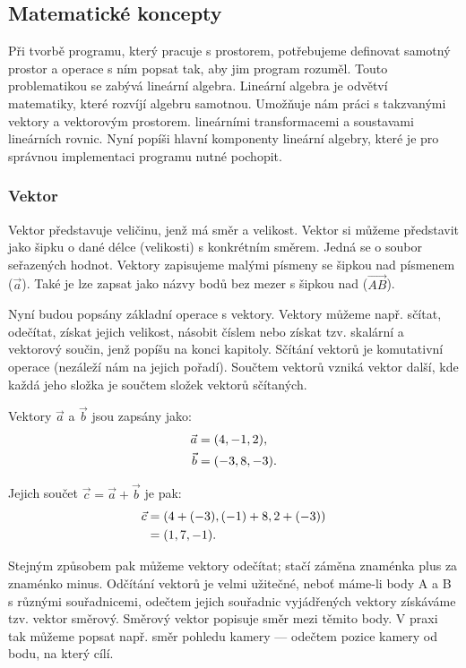 \documentclass[12pt]{article}
\begin{document}
\subsection{Matematické koncepty}

Při tvorbě programu, který pracuje s prostorem, potřebujeme definovat samotný prostor a operace s ním popsat tak, aby jim program rozuměl. Touto problematikou se zabývá lineární algebra. Lineární algebra je odvětví matematiky, které rozvíjí algebru samotnou. Umožňuje nám práci s takzvanými vektory a vektorovým prostorem. lineárními transformacemi a soustavami lineárních rovnic. \cite{linear_algebra} Nyní popíši hlavní komponenty lineární algebry, které je pro správnou implementaci programu nutné pochopit.

\subsubsection{Vektor} \label{vector}

Vektor představuje veličinu, jenž má směr a velikost. Vektor si můžeme představit jako šipku o dané délce (velikosti) s konkrétním směrem. Jedná se o soubor seřazených hodnot. Vektory zapisujeme malými písmeny se šipkou nad písmenem ($\vec{a}$). Také je lze zapsat jako názvy bodů bez mezer s šipkou nad ($\vec{AB}$). \cite{vector}

Nyní budou popsány základní operace s vektory. Vektory můžeme např. sčítat, odečítat, získat jejich velikost, násobit číslem nebo získat tzv. skalární a vektorový součin, jenž popíšu na konci kapitoly. Sčítání vektorů je komutativní operace (nezáleží nám na jejich pořadí). Součtem vektorů vzniká vektor další, kde každá jeho složka je součtem složek vektorů sčítaných.

Vektory $\vec{a}$ a $\vec{b}$ jsou zapsány jako:
\begin{align}
    \vec{a} &= (4, -1, 2), \notag \\
    \vec{b} &= (-3, 8, -3).
\end{align}

Jejich součet $\vec{c} = \vec{a} + \vec{b}$ je pak:
\begin{align}
    \vec{c} &= (4 + (-3), (-1) + 8, 2 + (-3)) \notag \\
      &= (1, 7, -1).
\end{align}

\pagebreak

Stejným způsobem pak můžeme vektory odečítat; stačí záměna znaménka plus za znaménko minus. Odčítání vektorů je velmi užitečné, neboť máme-li body A a B s různými souřadnicemi, odečtem jejich souřadnic vyjádřených vektory získáváme tzv. vektor směrový. Směrový vektor popisuje směr mezi těmito body. V praxi tak můžeme popsat např. směr pohledu kamery — odečtem pozice kamery od bodu, na který cílí.
\end{document}
